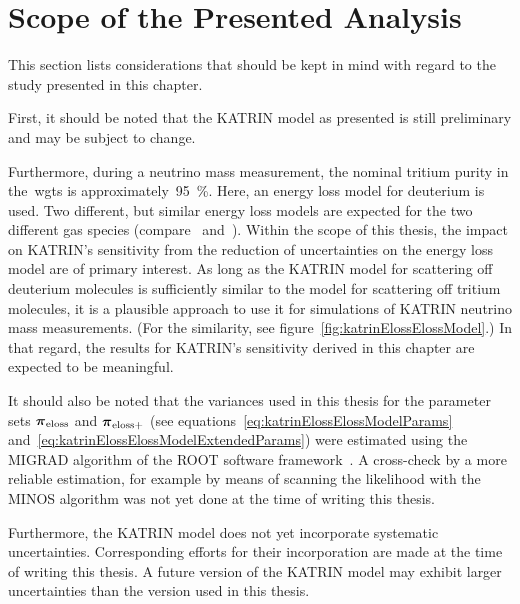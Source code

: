 \section{Scope of the Presented Analysis}
\label{sec:katrinElossValidity}
This section lists considerations that should be kept in mind with regard to the study presented in this chapter.

First, it should be noted that the KATRIN model as presented is still preliminary and may be subject to change.

Furthermore, during a neutrino mass measurement, the nominal tritium purity in the~\gls{wgts} is approximately~\SI{95}{\percent}. Here, an energy loss model for deuterium is used. Two different, but similar energy loss models are expected for the two different gas species (compare~\cite{Abdurashitov2017} and~\cite{Aseev2000}). Within the scope of this thesis, the impact on KATRIN's sensitivity from the reduction of uncertainties on the energy loss model are of primary interest. As long as the KATRIN model for scattering off deuterium molecules is sufficiently similar to the model for scattering off tritium molecules, it is a plausible approach to use it for simulations of KATRIN neutrino mass measurements. (For the similarity, see figure~\ref{fig:katrinElossElossModel}.) In that regard, the results for KATRIN's sensitivity derived in this chapter are expected to be meaningful.

It should also be noted that the variances used in this thesis for the parameter sets $\boldsymbol{\mathbf{\pi}}_\mathrm{eloss}$ and $\boldsymbol{\mathbf{\pi}}_\mathrm{eloss+}$ (see equations~\ref{eq:katrinElossElossModelParams} and~\ref{eq:katrinElossElossModelExtendedParams}) were estimated using the MIGRAD algorithm of the ROOT software framework~\cite{Hannen2019_1}. A cross-check by a more reliable estimation, for example by means of scanning the likelihood with the MINOS algorithm was not yet done at the time of writing this thesis.

Furthermore, the KATRIN model does not yet incorporate systematic uncertainties. Corresponding efforts for their incorporation are made at the time of writing this thesis. A future version of the KATRIN model may exhibit larger uncertainties than the version used in this thesis.



\def\currentRootFolder{chapter/sensitivityStudyWithPreliminaryKatrinElossModel}
\def\currentFigureFolder{\currentRootFolder/fig}

